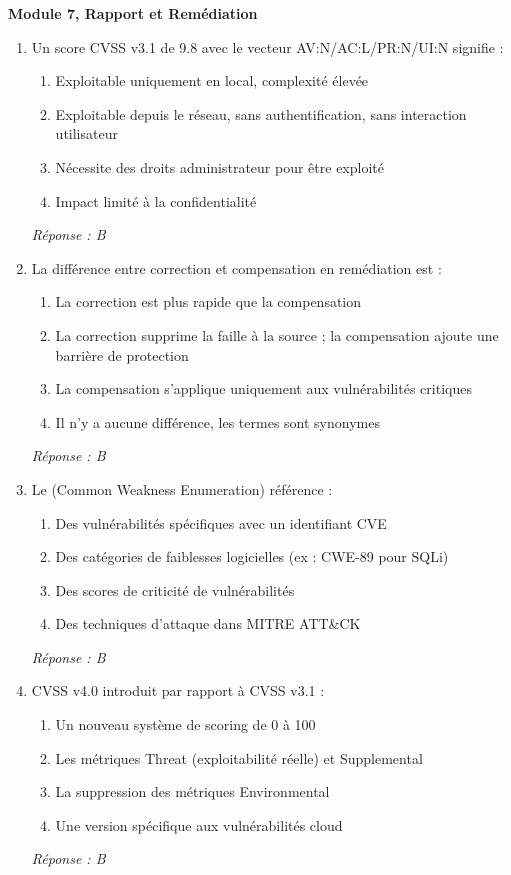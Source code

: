 \medskip
\noindent\textbf{Module 7, Rapport et Remédiation}

\begin{enumerate}[resume]

\item Un score CVSS v3.1 de 9.8 avec le vecteur AV:N/AC:L/PR:N/UI:N signifie :
\begin{enumerate}[label=\Alph*.]
    \item Exploitable uniquement en local, complexité élevée
    \item Exploitable depuis le réseau, sans authentification, sans interaction utilisateur
    \item Nécessite des droits administrateur pour être exploité
    \item Impact limité à la confidentialité
\end{enumerate}
\textit{Réponse : B}

\item La différence entre \og{}correction\fg{} et \og{}compensation\fg{} en remédiation est :
\begin{enumerate}[label=\Alph*.]
    \item La correction est plus rapide que la compensation
    \item La correction supprime la faille à la source ; la compensation ajoute une barrière de protection
    \item La compensation s'applique uniquement aux vulnérabilités critiques
    \item Il n'y a aucune différence, les termes sont synonymes
\end{enumerate}
\textit{Réponse : B}

\item Le  (Common Weakness Enumeration) référence :
\begin{enumerate}[label=\Alph*.]
    \item Des vulnérabilités spécifiques avec un identifiant CVE
    \item Des catégories de faiblesses logicielles (ex : CWE-89 pour SQLi)
    \item Des scores de criticité de vulnérabilités
    \item Des techniques d'attaque dans MITRE ATT\&CK
\end{enumerate}
\textit{Réponse : B}

\item CVSS v4.0 introduit par rapport à CVSS v3.1 :
\begin{enumerate}[label=\Alph*.]
    \item Un nouveau système de scoring de 0 à 100
    \item Les métriques Threat (exploitabilité réelle) et Supplemental
    \item La suppression des métriques Environmental
    \item Une version spécifique aux vulnérabilités cloud
\end{enumerate}
\textit{Réponse : B}

\end{enumerate}

